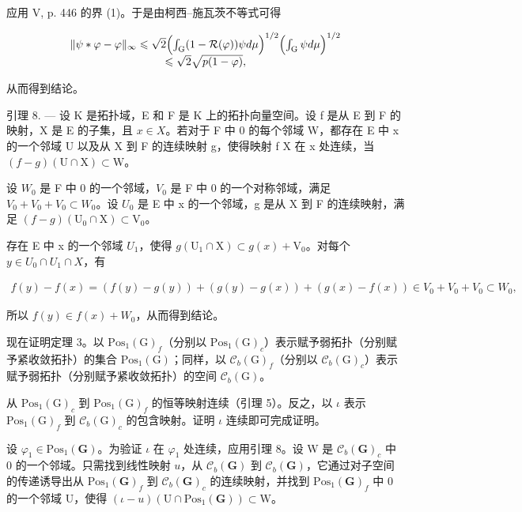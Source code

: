 应用 V, p. 446 的界 (1)。于是由柯西–施瓦茨不等式可得

\[
\begin{array}{c} \| \psi * \varphi - \varphi \| _ {\infty} \leqslant \sqrt {2} \Bigl (\int_ {\mathrm{G}} (1 - \mathcal {R} (\varphi)) \psi   d \mu \Bigr) ^ {1 / 2} \Bigl (\int_ {\mathrm{G}} \psi   d \mu \Bigr) ^ {1 / 2} \\ \leqslant \sqrt {2} \sqrt {p (1 - \varphi)}, \end{array}
\]

从而得到结论。

引理 8. --- 设 K 是拓扑域，E 和 F 是 K 上的拓扑向量空间。设 f 是从 E 到 F 的映射，X 是 E 的子集，且 \(x \in X\)。若对于 F 中 0 的每个邻域 W，都存在 E 中 x 的一个邻域 U 以及从 X 到 F 的连续映射 g，使得映射 f \textbar{} X 在 x 处连续，当 \((f - g)(\mathrm{U} \cap \mathrm{X}) \subset \mathrm{W}\)。

设 \(W_{0}\) 是 F 中 0 的一个邻域，\(V_{0}\) 是 F 中 0 的一个对称邻域，满足 \(V_{0} + V_{0} + V_{0} \subset W_{0}\)。设 \(U_{0}\) 是 E 中 x 的一个邻域，g 是从 X 到 F 的连续映射，满足 \((f - g)(\mathrm{U}_{0} \cap \mathrm{X}) \subset \mathrm{V}_{0}\)。

存在 E 中 x 的一个邻域 \(U_{1}\)，使得 \(g(\mathrm{U}_{1} \cap \mathrm{X}) \subset g(x) + \mathrm{V}_{0}\)。对每个 \(y \in U_{0} \cap U_{1} \cap X\)，有

\[
\begin{array}{c} f (y) - f (x) = (f (y) - g (y)) + (g (y) - g (x)) + (g (x) - f (x)) \in V_{0} + V_{0} + V_{0} \subset W_{0}, \end{array}
\]

所以 \(f(y) \in f(x) + W_{0}\)，从而得到结论。

现在证明定理 3。以 \(\mathrm{Pos}_{1}(\mathrm{G})_{f}\)（分别以 \(\mathrm{Pos}_{1}(\mathrm{G})_{c}\)）表示赋予弱拓扑（分别赋予紧收敛拓扑）的集合 \(\mathrm{Pos}_{1}(\mathrm{G})\)；同样，以 \(\mathcal{C}_{b}(\mathrm{G})_{f}\)（分别以 \(\mathcal{C}_{b}(\mathrm{G})_{c}\)）表示赋予弱拓扑（分别赋予紧收敛拓扑）的空间 \(\mathcal{C}_{b}(\mathrm{G})\)。

从 \(\mathrm{Pos}_{1}(\mathrm{G})_{c}\) 到 \(\mathrm{Pos}_{1}(\mathrm{G})_{f}\) 的恒等映射连续（引理 5）。反之，以 \(\iota\) 表示 \(\mathrm{Pos}_{1}(\mathrm{G})_{f}\) 到 \(\mathcal{C}_{b}(\mathrm{G})_{c}\) 的包含映射。证明 \(\iota\) 连续即可完成证明。

设 \(\varphi_{1} \in \mathrm{Pos}_{1}(\mathbf{G})\)。为验证 \(\iota\) 在 \(\varphi_{1}\) 处连续，应用引理 8。设 W 是 \(\mathcal{C}_{b}(\mathbf{G})_{c}\) 中 0 的一个邻域。只需找到线性映射 \(u\)，从 \(\mathcal{C}_{b}(\mathbf{G})\) 到 \(\mathcal{C}_{b}(\mathbf{G})\)，它通过对子空间的传递诱导出从 \(\mathrm{Pos}_{1}(\mathbf{G})_{f}\) 到 \(\mathcal{C}_{b}(\mathbf{G})_{c}\) 的连续映射，并找到 \(\mathrm{Pos}_{1}(\mathbf{G})_{f}\) 中 0 的一个邻域 U，使得 \((\iota - u)(\mathrm{U} \cap \mathrm{Pos}_{1}(\mathbf{G})) \subset \mathrm{W}\)。

